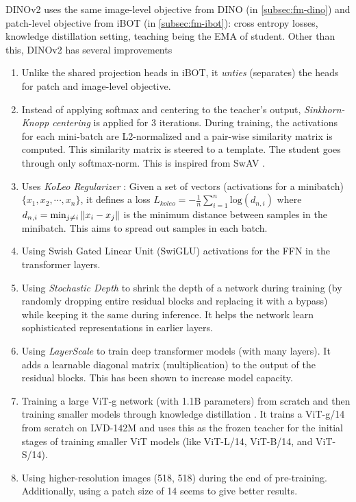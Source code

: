 DINOv2 uses the same image-level objective from DINO (in
\cref{subsec:fm-dino}) and patch-level objective from iBOT (in
\cref{subsec:fm-ibot}): cross entropy losses, knowledge distillation
setting, teaching being the EMA of student. Other than this, DINOv2
has several improvements

\begin{enumerate}
    \item Unlike the shared projection heads in iBOT, it \emph{unties}
        (separates) the heads for patch and image-level objective.
    \item Instead of applying softmax and centering to the teacher's
        output, \emph{Sinkhorn-Knopp centering} is applied for 3
        iterations. During training, the activations for each
        mini-batch are L2-normalized and a pair-wise similarity matrix
        is computed. This similarity matrix is steered to a template.
        The student goes through only softmax-norm. This is inspired
        from SwAV \cite{Caron2020UnsupervisedLO}.
    \item Uses \emph{KoLeo Regularizer}
        \cite{Sablayrolles2018SpreadingVF}: Given a set of vectors
        (activations for a minibatch) $\{x_1, x_2, \cdots, x_n\}$, it
        defines a loss $L_{koleo} = -\frac{1} {n} \sum_{i=1}^n
        \mathrm{log}(d_{n, i})$ where $d_{n, i} = \textup{min}_{j \neq
        i} \left\|x_i - x_j\right\|$ is the minimum distance between
        samples in the minibatch. This aims to spread out samples in
        each batch.
    \item Using Swish Gated Linear Unit (SwiGLU) activations
        \cite{Shazeer2020GLUVI} for the FFN in the transformer layers.
    \item Using \emph{Stochastic Depth} \cite{Huang2016DeepNW} to
        shrink the depth of a network during training (by randomly
        dropping entire residual blocks and replacing it with a
        bypass) while keeping it the same during inference. It helps
        the network learn sophisticated representations in earlier
        layers.
    \item Using \emph{LayerScale} \cite{Touvron2021GoingDW} to train
        deep transformer models (with many layers). It adds a
        learnable diagonal matrix (multiplication) to the output of
        the residual blocks. This has been shown to increase model
        capacity.
    \item Training a large ViT-g network (with 1.1B parameters) from
        scratch and then training smaller models through knowledge
        distillation \cite{Hinton2015DistillingTK}. It trains a
        ViT-g/14 from scratch on LVD-142M and uses this as the frozen
        teacher for the initial stages of training smaller ViT models
        (like ViT-L/14, ViT-B/14, and ViT-S/14).
    \item Using higher-resolution images (518, 518) during the end of
        pre-training. Additionally, using a patch size of 14 seems to
        give better results.
\end{enumerate}

